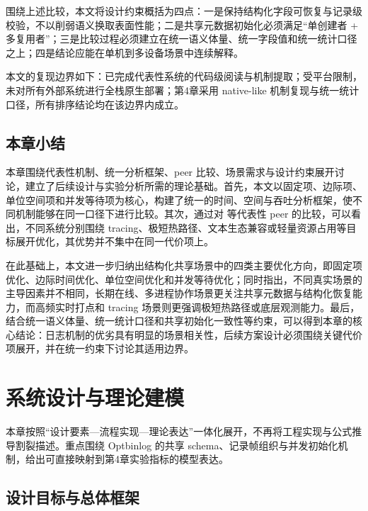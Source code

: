 围绕上述比较，本文将设计约束概括为四点：一是保持结构化字段可恢复与记录级校验，不以削弱语义换取表面性能；二是共享元数据初始化必须满足``单创建者 + 多复用者''；三是比较过程必须建立在统一语义体量、统一字段值和统一统计口径之上；四是结论应能在单机到多设备场景中连续解释。

本文的复现边界如下：已完成代表性系统的代码级阅读与机制提取；受平台限制，未对所有外部系统进行全栈原生部署；第4章采用 native-like 机制复现与统一统计口径，所有排序结论均在该边界内成立。

\subsection{本章小结}\label{ux672cux7ae0ux5c0fux7ed3}

本章围绕代表性机制、统一分析框架、peer 比较、场景需求与设计约束展开讨论，建立了后续设计与实验分析所需的理论基础。首先，本文以固定项、边际项、单位空间项和并发等待项为核心，构建了统一的时间、空间与吞吐分析框架，使不同机制能够在同一口径下进行比较。其次，通过对  等代表性 peer 的比较，可以看出，不同系统分别围绕 tracing、极短热路径、文本生态兼容或轻量资源占用等目标展开优化，其优势并不集中在同一代价项上。

在此基础上，本文进一步归纳出结构化共享场景中的四类主要优化方向，即固定项优化、边际时间优化、单位空间优化和并发等待优化；同时指出，不同真实场景的主导因素并不相同，长期在线、多进程协作场景更关注共享元数据与结构化恢复能力，而高频实时打点和 tracing 场景则更强调极短热路径或底层观测能力。最后，结合统一语义体量、统一统计口径和共享初始化一致性等约束，可以得到本章的核心结论：日志机制的优劣具有明显的场景相关性，后续方案设计必须围绕关键代价项展开，并在统一约束下讨论其适用边界。

\section{系统设计与理论建模}\label{ux7cfbux7edfux8bbeux8ba1ux4e0eux7406ux8bbaux5efaux6a21}

本章按照``设计要素---流程实现---理论表达''一体化展开，不再将工程实现与公式推导割裂描述。重点围绕 Optbinlog 的共享 schema、记录帧组织与并发初始化机制，给出可直接映射到第4章实验指标的模型表达。

\subsection{设计目标与总体框架}\label{ux8bbeux8ba1ux76eeux6807ux4e0eux603bux4f53ux6846ux67b6}

